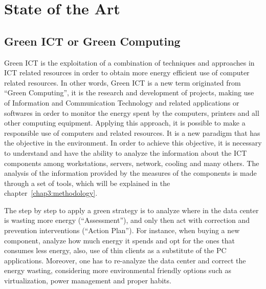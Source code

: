 

\chapter{State of the Art} \label{chap2:state_of_the_art}
    \section{Green ICT or Green Computing} \label{sec2:green_ict}
        Green ICT is the exploitation of a combination of techniques and approaches in ICT related resources in order to obtain more energy efficient use of computer related resources. In other words, Green ICT is a new term originated from ``Green Computing'', it is the research and development of projects, making use of Information and Communication Technology and related applications or softwares in order to monitor the energy spent by the computers, printers and all other computing equipment. Applying this approach, it is possible to make a responsible use of computers and related resources. It is a new paradigm that has the objective in the environment. In order to achieve this objective, it is necessary to understand and have the ability to analyze the information about the ICT components among workstations, servers, network, cooling and many others. The analysis of the information provided by the measures of the components is made through a set of tools, which will be explained in the chapter~\ref{chap3:methodology}. 
        
        The step by step to apply a green strategy is to analyze where in the data center is wasting more energy (``Assessment''), and only then act with correction and prevention interventions (``Action Plan''). For instance, when buying a new component, analyze how much energy it spends and opt for the ones that consumes less energy, also, use of thin clients as a substitute of the PC applications. Moreover, one has to re-analyze the data center and correct the energy wasting, considering more environmental friendly options such as virtualization, power management and proper habits.
        
